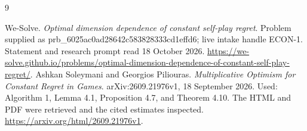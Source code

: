 \documentclass[11pt]{article}
\begin{document}
\begin{thebibliography}{9}
\raggedright
{}
We-Solve. \emph{Optimal dimension dependence of constant self-play regret}.
Problem supplied as prb_6025ac0ad28642c583828333cd1effd6; live intake handle ECON-1. Statement and
research prompt read 18 October 2026.
\url{https://we-solve.github.io/problems/optimal-dimension-dependence-of-constant-self-play-regret/}.
Ashkan Soleymani and Georgios Piliouras.
\emph{Multiplicative Optimism for Constant Regret in Games}.
arXiv:2609.21976v1, 18 September 2026. Used: Algorithm 1,
Lemma 4.1, Proposition 4.7, and Theorem 4.10. The HTML and PDF were
retrieved and the cited estimates inspected.
\url{https://arxiv.org/html/2609.21976v1}.
\end{thebibliography}
\end{document}
